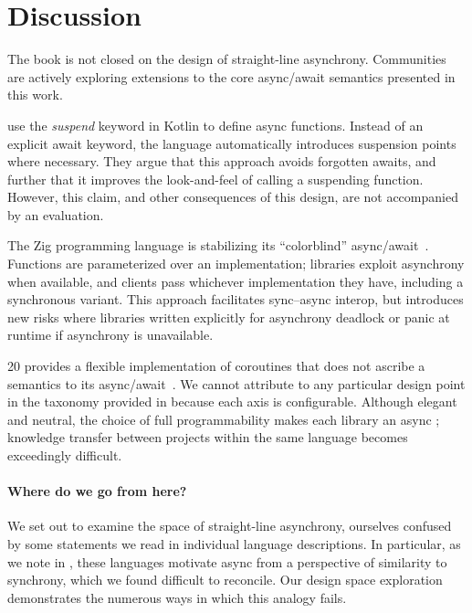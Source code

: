 \section{Discussion}\label{sec:discussion}

The book is not closed on the design of straight-line asynchrony. Communities are actively exploring extensions to the core async/await semantics presented in this work.

\citet{elizarov_kotlin_2021} use the \emph{suspend} keyword in Kotlin to define async functions. Instead of an explicit await keyword, the language automatically introduces suspension points where necessary. They argue that this approach avoids forgotten awaits, and further that it improves the look-and-feel of calling a suspending function. However, this claim, and other consequences of this design, are not accompanied by an evaluation.

The Zig programming language is stabilizing its ``colorblind'' async/await~\cite{kelley_zigs_2025,cro_what_2020}. Functions are parameterized over an  implementation; libraries exploit asynchrony when available, and clients pass whichever  implementation they have, including a synchronous variant. This approach facilitates sync--async interop, but introduces new risks where libraries written explicitly for asynchrony deadlock or panic at runtime if asynchrony is unavailable.

\Cpp{}20 provides a flexible implementation of coroutines that does not ascribe a semantics to its async/await~\cite{isoiec_jtc1_sc22_wg21_technical_2017}. We cannot attribute \Cpp to any particular design point in the taxonomy provided in  because each axis is configurable. Although elegant and neutral, the choice of full programmability makes each library an async ; knowledge transfer between projects within the same language becomes exceedingly difficult.

\paragraph{Where do we go from here?}

We set out to examine the space of straight-line asynchrony, ourselves confused by some statements we read in individual language descriptions. In particular, as we note in , these languages motivate async from a perspective of similarity to synchrony, which we found difficult to reconcile. Our design space exploration demonstrates the numerous ways in which this analogy fails.

